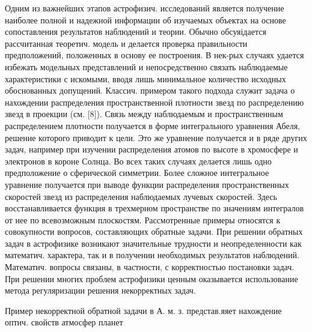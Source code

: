 \documentclass[10pt]{article}
\begin{document}
Одним из важнейших этапов астрофизич. исследований является получение наиболее полной и надежной информации об изучаемых объектах на основе сопоставления результатов наблюдений и теории. Обычно обсуяідается рассчитанная теоретич. модель и делается проверка правильности предположений, положенных в основу ее построения. В нек-рых случаях удается избежать модельных представлений и непосредственно связать наблюдаемые характеристики с искомыми, вводя лишь минимальное количество исходных обоснованных допущений. Классич. примером такого подхода служит задача о нахождении распределения пространственной плотности звезд по распределению звезд в проекции (см. [8]). Связь между наблюдаемым и пространственным распределением плотности получается в форме интегрального уравнения Абеля, решение которого приводит к цели. Это же уравнение получается и в ряде других задач, например при изучении распределения атомов по высоте в хромосфере и электронов в короне Солнца. Во всех таких случаях делается лишь одно предположение о сферической симметрии. Более сложное интегральное уравнение получается при выводе функции распределения пространственных скоростей звезд из распределения наблюдаемых лучевых скоростей. Здесь восстанавливается функция в трехмерном пространстве по значениям интегралов от нее по всевозможным плоскостям. Рассмотренные примеры относятся к совокупности вопросов, составляющих обратные задачи. При решении обратных задач в астрофизике возникают значительные трудности и неопределенности как математич. характера, так и в получении необходимых результатов наблюдений. Математич. вопросы связаны, в частности, с корректностью постановки задач. При решении многих проблем астрофизики ценным оказывается использование метода регуляризации решения некорректных задач.



Пример некорректной обратной задачи в А. м. з. представ.яяет нахождение оптич. свойств атмосфер планет
\end{document}
